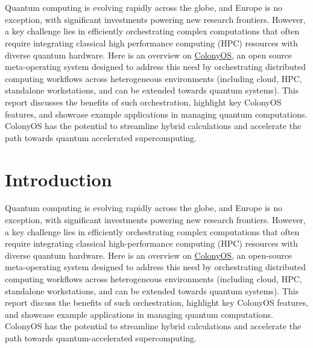 \documentclass{article}
\title{\MyDocTitle}
\makeatletter
\renewenvironment{abstract}{
  \if@twocolumn
    \section*{\abstractname}
  \else
    \begin{center}
      {\bfseries \abstractname\vspace{-.5em}\vspace{\z@}}
    \end{center}
    \quotation
  \fi}
  {\if@twocolumn\else\endquotation\fi}
\makeatother
\begin{document}
\author[1,2]{Karim Elgammal}
\author[2]{Erik Källman}
\author[1,2]{Thor Wikfeldt}
\date{April 2025}

\maketitle

\begin{abstract}
Quantum computing is evolving rapidly across the globe, and Europe is no exception, with significant investments powering new research frontiers. However, a key challenge lies in efficiently orchestrating complex computations that often require integrating classical high performance computing (HPC) resources with diverse quantum hardware. Here is an overview on \href{https://colonyos.io/}{ColonyOS}, an open source meta-operating system designed to address this need by orchestrating distributed computing workflows across heterogeneous environments (including cloud, HPC, standalone workstations, and can be extended towards quantum systems). This report discusses the benefits of such orchestration, highlight key ColonyOS features, and showcase example applications in managing quantum computations. ColonyOS has the potential to streamline hybrid calculations and accelerate the path towards quantum accelerated supercomputing.
\end{abstract}

\tableofcontents

\section{Introduction}\label{sec:introduction}
Quantum computing is evolving rapidly across the globe, and Europe is no exception, with significant investments powering new research frontiers. However, a key challenge lies in efficiently orchestrating complex computations that often require integrating classical high-performance computing (HPC) resources with diverse quantum hardware. Here is an overview on \href{https://colonyos.io/}{ColonyOS}, an open-source meta-operating system designed to address this need by orchestrating distributed computing workflows across heterogeneous environments (including cloud, HPC, standalone workstations, and can be extended towards quantum systems). This report discuss the benefits of such orchestration, highlight key ColonyOS features, and showcase example applications in managing quantum computations. ColonyOS has the potential to streamline hybrid calculations and accelerate the path towards quantum-accelerated supercomputing.
\end{document}
